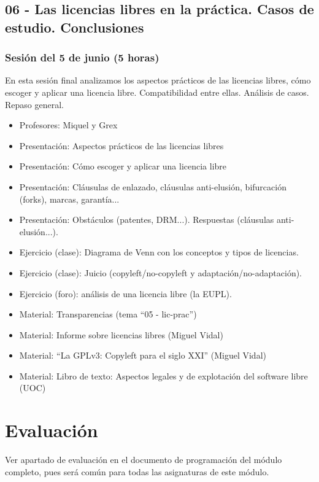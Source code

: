 \documentclass[a4paper,12pt]{article}
\begin{document}
\subsection{06 - Las licencias libres en la práctica. Casos de estudio. Conclusiones}

\subsubsection{Sesión del 5 de junio (5 horas)}

En esta sesión final analizamos los aspectos prácticos de las licencias libres, cómo escoger y aplicar una licencia libre. Compatibilidad entre ellas. Análisis de casos. Repaso general.

 \begin{itemize}
 \item Profesores: Miquel y Grex
 \item Presentación: Aspectos prácticos de las licencias libres
 \item Presentación: Cómo escoger y aplicar una licencia libre
 \item Presentación: Cláusulas de enlazado, cláusulas anti-elusión, bifurcación (forks), marcas, garantía...
 \item Presentación: Obstáculos (patentes, DRM...). Respuestas (cláusulas anti-elusión...). 
 \item Ejercicio (clase): Diagrama de Venn con los conceptos y tipos de licencias.  \\
 \item Ejercicio (clase): Juicio (copyleft/no-copyleft y adaptación/no-adaptación).  \\
 \item Ejercicio (foro): análisis de una licencia libre (la EUPL).  \\
 \item Material: Transparencias (tema ``05 - lic-prac'')
 \item Material: Informe sobre licencias libres (Miguel Vidal)
 \item Material: ``La GPLv3: Copyleft para el siglo XXI'' (Miguel Vidal)
 \item Material: Libro de texto: Aspectos legales y de explotación del software libre (UOC)
 \end{itemize}


\section{Evaluación}

Ver apartado de evaluación en el documento de programación del módulo completo, pues será común para todas las asignaturas de este módulo.
\end{document}
